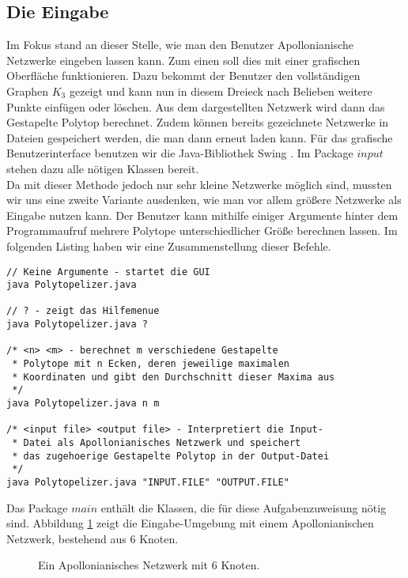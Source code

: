 \subsection*{Die Eingabe}
Im Fokus stand an dieser Stelle, wie man den Benutzer Apollonianische Netzwerke eingeben lassen kann. Zum einen soll dies mit einer grafischen Oberfläche funktionieren. Dazu bekommt der Benutzer den vollständigen Graphen $K_3$ gezeigt und kann nun in diesem Dreieck nach Belieben weitere Punkte einfügen oder löschen. Aus dem dargestellten Netzwerk wird dann das Gestapelte Polytop berechnet. Zudem können bereits gezeichnete Netzwerke in Dateien gespeichert werden, die man dann erneut laden kann. Für das grafische Benutzerinterface benutzen wir die Java-Bibliothek Swing \cite{swing}. Im Package $input$ stehen dazu alle nötigen Klassen bereit.\\
Da mit dieser Methode jedoch nur sehr kleine Netzwerke möglich sind, mussten wir uns eine zweite Variante ausdenken, wie man vor allem größere Netzwerke als Eingabe nutzen kann. Der Benutzer kann mithilfe einiger Argumente hinter dem Programmaufruf mehrere Polytope unterschiedlicher Größe berechnen lassen. Im folgenden Listing haben wir eine Zusammenstellung dieser Befehle.

\begin{lstlisting}[caption={Kommandozeilen-Befehle}]
// Keine Argumente - startet die GUI
java Polytopelizer.java

// ? - zeigt das Hilfemenue
java Polytopelizer.java ?

/* <n> <m> - berechnet m verschiedene Gestapelte
 * Polytope mit n Ecken, deren jeweilige maximalen
 * Koordinaten und gibt den Durchschnitt dieser Maxima aus
 */
java Polytopelizer.java n m

/* <input file> <output file> - Interpretiert die Input-
 * Datei als Apollonianisches Netzwerk und speichert
 * das zugehoerige Gestapelte Polytop in der Output-Datei
 */
java Polytopelizer.java "INPUT.FILE" "OUTPUT.FILE"
\end{lstlisting}

Das Package $main$ enthält die Klassen, die für diese Aufgabenzuweisung nötig sind. Abbildung \ref{apollNet} zeigt die Eingabe-Umgebung mit einem Apollonianischen Netzwerk, bestehend aus 6 Knoten.

\begin{figure}[htbp]
	\centering
	\caption{Ein Apollonianisches Netzwerk mit 6 Knoten.}
	\label{apollNet}
\end{figure}

